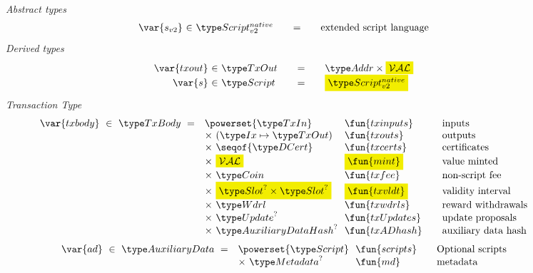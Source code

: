 \begin{figure*}[t!]
  \emph{Abstract types}
  \begin{equation*}
    \begin{array}{r@{~\in~}l@{\qquad=\qquad}lr}
      \var{s_{v2}} & \Timelock & \text{extended script language}
    \end{array}
  \end{equation*}
  \emph{Derived types}
  \begin{equation*}
    \begin{array}{r@{~\in~}l@{\qquad=\qquad}lr}
      \var{txout} & \TxOut & \Addr \times \hldiff{\ValClass} \\
      \var{s} & \Script & \hldiff{\Timelock}
      \\
    \end{array}
  \end{equation*}
  \emph{Transaction Type}
  \begin{equation*}
    \begin{array}{r@{~~}l@{~~}l@{\qquad}l}
      \var{txbody} ~\in~ \TxBody ~=~
      & \powerset{\TxIn} & \fun{txinputs}& \text{inputs}\\
      &\times ~(\Ix \mapsto \TxOut) & \fun{txouts}& \text{outputs}\\
      & \times~ \seqof{\DCert} & \fun{txcerts}& \text{certificates}\\
       & \times ~\hldiff{\ValClass}  & \hldiff{\fun{mint}} &\text{value minted}\\
       & \times ~\Coin & \fun{txfee} &\text{non-script fee}\\
       & \times ~\hldiff{\Slot^? \times \Slot^?} & \hldiff{\fun{txvldt}} & \text{validity interval}\\
       & \times~ \Wdrl  & \fun{txwdrls} &\text{reward withdrawals}\\
       & \times ~\Update^?  & \fun{txUpdates} & \text{update proposals}\\
       & \times ~\AuxiliaryDataHash^? & \fun{txADhash} & \text{auxiliary data hash}
    \end{array}
  \end{equation*}
  \begin{equation*}
    \begin{array}{r@{~~}l@{~~}l@{\qquad}l}
      \var{ad} ~\in~ \AuxiliaryData ~=~
      & \powerset{\Script} & \fun{scripts}& \text{Optional scripts}\\
      & \times ~\Metadata^? & \fun{md} & \text{metadata}

\end{array}
\end{equation*}
\end{figure*}
